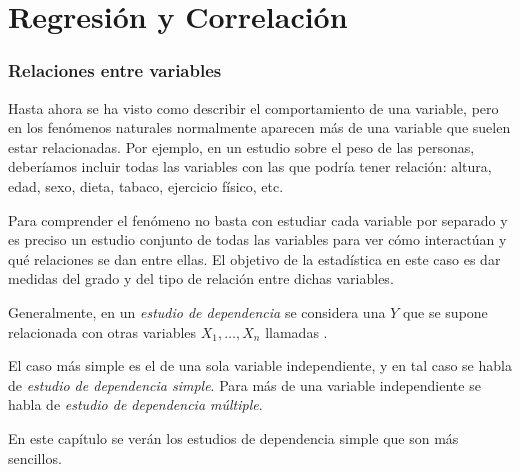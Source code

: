
\section{Regresión y Correlación}



\begin{frame}
\frametitle{Relaciones entre variables}
Hasta ahora se ha visto como describir el comportamiento de una variable, pero en los fenómenos naturales normalmente aparecen más de una
variable que suelen estar relacionadas. 
Por ejemplo, en un estudio sobre el peso de las personas, deberíamos incluir todas las variables con las que podría tener relación: altura, edad, sexo, dieta, tabaco, ejercicio físico, etc.

Para comprender el fenómeno no basta con estudiar cada variable por separado y es preciso un estudio conjunto de todas las variables para ver cómo interactúan y qué relaciones se dan entre ellas. 
El objetivo de la estadística en este caso es dar medidas del grado y del tipo de relación
entre dichas variables.

Generalmente, en un \emph{estudio de dependencia} se considera una  $Y$ que se supone relacionada con otras variables $X_1,\ldots,X_n$ llamadas
.

El caso más simple es el de una sola variable independiente, y en tal caso se habla de \emph{estudio de dependencia simple}. Para más de una variable independiente se habla de \emph{estudio de dependencia múltiple}.

En este capítulo se verán los estudios de dependencia simple que son más sencillos.  

\end{frame}
